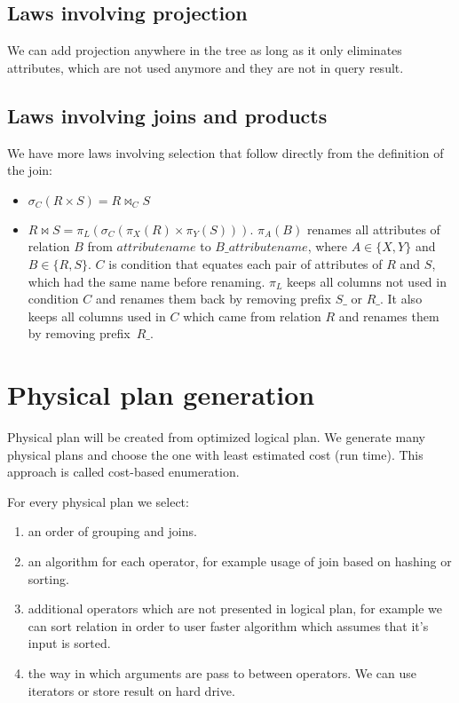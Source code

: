 \subsection{Laws involving projection}
We can add projection anywhere in the tree as long as it only eliminates attributes, which are not used anymore and they are not in query result.

\subsection{Laws involving joins and products}

We have more laws involving selection that follow directly from the definition of the join:
\begin{itemize}
\item $\sigma_{C}(R \times S)=R \Join_{C} S$
\item $R \Join S=\pi_L(\sigma_{C}(\pi_X(R) \times \pi_Y(S)))$. $\pi_A(B)$ renames all attributes of relation $B$ from $attributename$ to $B\_attributename$, where $A\in\{X,Y\}$ and $B\in\{R,S\}$. $C$ is condition that equates each pair of attributes of $R$ and $S$, which had the same name before renaming. $\pi_L$ keeps all columns not used in condition $C$ and renames them back by removing prefix $S\_$ or $R\_$. It also keeps all columns used in $C$ which came from relation $R$ and renames them by removing prefix~$R\_$.
\end{itemize}



\section{Physical plan generation}

Physical plan will be created from optimized logical plan. We generate many physical plans and choose the one with least estimated cost (run time). This approach is called cost-based enumeration.

For every physical plan we select:
\begin{enumerate}
\item an order of grouping and joins.
\item an algorithm for each operator, for example usage of join based on hashing or sorting.
\item additional operators which are not presented in logical plan, for example we can sort relation in order to user faster algorithm which assumes that it's input is sorted.
\item the way in which arguments are pass to between operators. We can use iterators  or store result on hard drive.
\end{enumerate}

